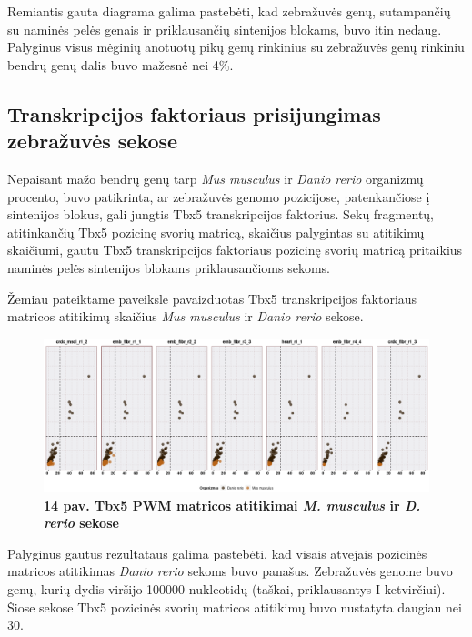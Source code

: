 \documentclass[12pt]{article}
\begin{document}
Remiantis gauta diagrama galima pastebėti, kad zebražuvės genų, sutampančių su
naminės pelės genais ir priklausančių sintenijos blokams, buvo itin nedaug.
Palyginus visus mėginių anotuotų pikų genų rinkinius su zebražuvės genų rinkiniu
bendrų genų dalis buvo mažesnė nei 4\%.

\newpage

\subsection{Transkripcijos faktoriaus prisijungimas zebražuvės sekose}
Nepaisant mažo bendrų genų tarp \emph{Mus musculus} ir \emph{Danio rerio}
organizmų procento, buvo patikrinta, ar zebražuvės genomo pozicijose,
patenkančiose į sintenijos blokus, gali jungtis Tbx5 transkripcijos faktorius.
Sekų fragmentų, atitinkančių Tbx5 pozicinę svorių matricą, skaičius palygintas
su atitikimų skaičiumi, gautu Tbx5 transkripcijos faktoriaus pozicinę svorių
matricą pritaikius naminės pelės sintenijos blokams priklausančioms sekoms.

Žemiau pateiktame paveiksle pavaizduotas Tbx5 transkripcijos faktoriaus matricos
atitikimų skaičius \emph{Mus musculus} ir \emph{Danio rerio} sekose.

\begin{figure}[htb]
    \begin{center}
        \includegraphics[width=1\linewidth]{../Figures/PWM_matches_all.png}
        \vspace{-2\baselineskip}
        \caption*{\small\textbf{14 pav. Tbx5 PWM matricos atitikimai
        \emph{M. musculus} ir \emph{D. rerio} sekose}}
        \label{fig:birds}
    \end{center}
\end{figure}

Palyginus gautus rezultataus galima pastebėti, kad visais atvejais pozicinės
matricos atitikimas \emph{Danio rerio} sekoms buvo panašus. Zebražuvės genome
buvo genų, kurių dydis viršijo 100000 nukleotidų (taškai, priklausantys I
ketvirčiui). Šiose sekose Tbx5 pozicinės svorių matricos atitikimų buvo
nustatyta daugiau nei 30.
\end{document}

